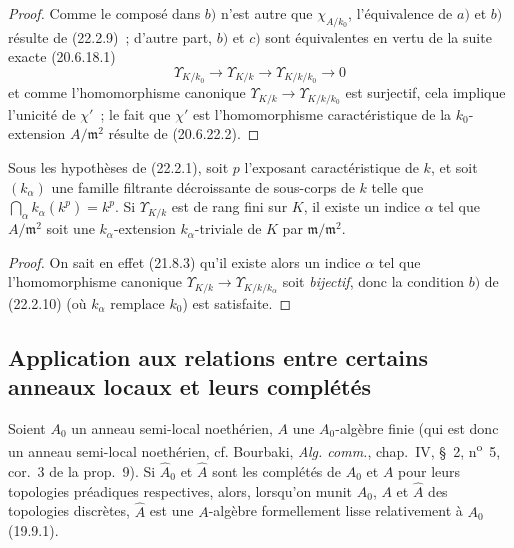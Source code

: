 \begin{proof}
Comme le composé dans $b)$ n'est autre que $\chi_{A/k_0}$, l'équivalence de
$a)$ et $b)$ résulte de (22.2.9)~; d'autre part, $b)$ et $c)$ sont
équivalentes en vertu de la suite exacte (20.6.18.1)
\[
  \Upsilon_{K/k_0}\longrightarrow\Upsilon_{K/k}
  \longrightarrow\Upsilon_{K/k/k_0}\longrightarrow0
\]
et comme l'homomorphisme canonique
$\Upsilon_{K/k}\to\Upsilon_{K/k/k_0}$ est surjectif, cela implique l'unicité
de $\chi'$~; le fait que $\chi'$ est l'homomorphisme caractéristique de la
$k_0$-extension $A/\mathfrak m^2$ résulte de (20.6.22.2).
\end{proof}

\begin{corollary}[22.2.11]
\label{0.22.2.11-fr}
Sous les hypothèses de \textup{(22.2.1)}, soit $p$ l'exposant caractéristique de $k$,
et soit $(k_\alpha)$ une famille filtrante décroissante de sous-corps de $k$
telle que $\bigcap_\alpha k_\alpha(k^p)=k^p$. Si $\Upsilon_{K/k}$ est de rang
fini sur $K$, il existe un indice $\alpha$ tel que $A/\mathfrak m^2$ soit une
$k_\alpha$-extension $k_\alpha$-triviale de $K$ par
$\mathfrak m/\mathfrak m^2$.
\end{corollary}

\begin{proof}
On sait en effet (21.8.3) qu'il existe alors un indice $\alpha$ tel que
l'homomorphisme canonique
$\Upsilon_{K/k}\to\Upsilon_{K/k/k_\alpha}$ soit \emph{bijectif}, donc la condition
$b)$ de (22.2.10) (où $k_\alpha$ remplace $k_0$) est satisfaite.
\end{proof}

\subsection{Application aux relations entre certains anneaux locaux et leurs complétés}
\label{subsection:0.22.3-fr}

\begin{lemma}[22.3.1]
\label{0.22.3.1-fr}
Soient $A_0$ un anneau semi-local noethérien, $A$ une $A_0$-algèbre finie
(qui est donc un anneau semi-local noethérien, \textup{cf. Bourbaki,
\emph{Alg. comm.}, chap.~IV, §~2, n\textsuperscript{o}~5, cor.~3 de la
prop.~9)}. Si $\widehat A_0$ et $\widehat A$ sont les complétés de $A_0$ et
$A$ pour leurs topologies préadiques respectives, alors, lorsqu'on munit
$A_0$, $A$ et $\widehat A$ des topologies \textup{discrètes}, $\widehat A$ est une
$A$-algèbre formellement lisse relativement à $A_0$ \textup{(19.9.1)}.
\end{lemma}

